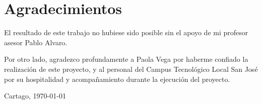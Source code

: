 \chapter*{Agradecimientos}
\thispagestyle{empty}

El resultado de este trabajo no hubiese sido posible sin el apoyo 
de mi profesor asesor Pablo Alvaro.

Por otro lado, agradezco  profundamente a Paola Vega por haberme confiado
la realización de este proyecto, y al personal del Campus Tecnológico
Local San José por su hospitalidad y acompañamiento durante la ejecución del proyecto.

\vspace*{1cm}

\thesisAuthor

Cartago, \today

\cleardoublepage


